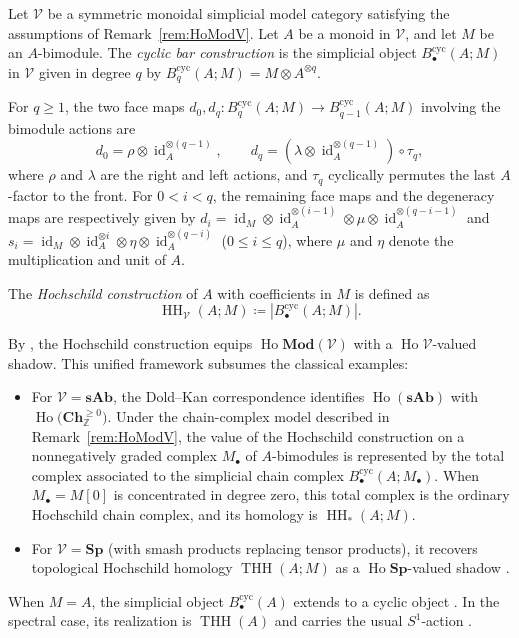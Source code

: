 \documentclass[11pt,oneside]{amsart}
\DeclareMathOperator{\Ho}{Ho}
\DeclareMathOperator{\THH}{THH}
\DeclareMathOperator{\HH}{HH}
\DeclareMathOperator{\id}{id}
\numberwithin{equation}{section}
\numberwithin{figure}{section}
\theoremstyle{plain}
\theoremstyle{definition}
\theoremstyle{remark}
\begin{document}
 \begin{definition}\label{def:cyclic_bar_general}
Let $\mathcal V$ be a symmetric monoidal simplicial model category satisfying the assumptions of Remark~\ref{rem:HoModV}. Let $A$ be a monoid in $\mathcal V$, and let $M$ be an $A$-bimodule. The \emph{cyclic bar construction} is the simplicial object $B_\bullet^{\mathrm{cyc}}(A;M)$ in $\mathcal V$ given in degree $q$ by $B_q^{\mathrm{cyc}}(A;M) = M\otimes A^{\otimes q}$.

For $q\geq 1$, the two face maps $d_0, d_q \colon B_q^{\mathrm{cyc}}(A;M) \to B_{q-1}^{\mathrm{cyc}}(A;M)$ involving the bimodule actions are
\[
d_0 = \rho\otimes\id_A^{\otimes(q-1)},\qquad
d_q = (\lambda\otimes\id_A^{\otimes(q-1)})\circ\tau_q,
\]
where $\rho$ and $\lambda$ are the right and left actions, and $\tau_q$ cyclically permutes the last $A$-factor to the front. For $0<i<q$, the remaining face maps and the degeneracy maps are respectively given by
\(
d_i = \id_M\otimes\id_A^{\otimes(i-1)}\otimes\mu\otimes\id_A^{\otimes(q-i-1)}
\)
and
\(
s_i = \id_M\otimes\id_A^{\otimes i}\otimes\eta\otimes\id_A^{\otimes(q-i)}
\)
($0\le i\le q$), where $\mu$ and $\eta$ denote the multiplication and unit of $A$.

The \emph{Hochschild construction} of $A$ with coefficients in $M$ \cite[Definition~3.1.4]{AGHKK} is defined as
\[
\HH_{\mathcal V}(A;M) \coloneqq \left|B_\bullet^{\mathrm{cyc}}(A;M)\right|.
\]
\end{definition}

\begin{remark}\label{rem:HH-construction}
By \cite[Proposition~3.1.5]{AGHKK}, the Hochschild construction equips $\Ho\mathbf{Mod}(\mathcal V)$ with a $\Ho\mathcal V$-valued shadow. This unified framework subsumes the classical examples:
\begin{itemize}
\item For \(\mathcal V=\mathbf{sAb}\), the Dold--Kan correspondence
identifies \(\Ho(\mathbf{sAb})\) with
\(\Ho\bigl(\mathbf{Ch}_{\mathbb Z}^{\geq 0}\bigr)\).
Under the chain-complex model described in
Remark~\ref{rem:HoModV}, the value of the Hochschild construction on
a nonnegatively graded complex \(M_\bullet\) of \(A\)-bimodules is
represented by the total complex associated to the simplicial chain
complex
\(
B_\bullet^{\mathrm{cyc}}(A;M_\bullet).
\)
When \(M_\bullet=M[0]\) is concentrated in degree zero, this total
complex is the ordinary Hochschild chain complex, and its homology is
\(\HH_*(A;M)\).
    \item For $\mathcal V=\mathbf{Sp}$ (with smash products replacing tensor products), it recovers topological Hochschild homology $\THH(A;M)$ as a $\Ho\mathbf{Sp}$-valued shadow \cite{CP}.
\end{itemize}
When \(M=A\), the simplicial object
\(B_\bullet^{\mathrm{cyc}}(A)\) extends to a cyclic object
\cite{loday2013cyclic}. In the spectral case, its realization is
\(\THH(A)\) and carries the usual \(S^1\)-action \cite{BHM}.
\end{remark}
\end{document}
